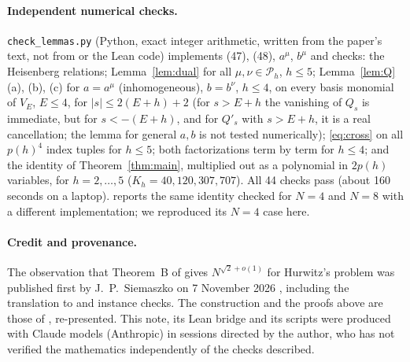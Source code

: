 \documentclass[11pt]{amsart}
\theoremstyle{remark}
\newcommand{\cP}{\mathcal{P}}
\begin{document}
\medskip

\paragraph{Independent numerical checks.} \texttt{check\_lemmas.py} (Python, exact integer arithmetic, written
from the paper's text, not from \cite{Sie} or the Lean code) implements (47), (48), $a^\mu$, $b^\mu$ and checks:
the Heisenberg relations; Lemma~\ref{lem:dual} for all $\mu,\nu\in\cP_h$, $h\le5$; Lemma~\ref{lem:Q}(a), (b), (c) for
$a=a^\mu$ (inhomogeneous), $b=b^\nu$, $h\le4$, on every basis monomial of $V_E$, $E\le4$, for $|s|\le2(E+h)+2$ (for
$s>E+h$ the vanishing of $Q_s$ is immediate, but for $s<-(E+h)$, and for $Q'_s$ with $s>E+h$, it is a real cancellation;
the lemma for general $a,b$ is not tested numerically);
\eqref{eq:cross} on all $p(h)^4$ index tuples for $h\le5$; both factorizations term by term for $h\le4$; and the identity of
Theorem~\ref{thm:main}, multiplied out as a polynomial in $2p(h)$ variables, for $h=2,\dots,5$ ($K_h=40,120,307,707$).
All 44 checks pass (about 160 seconds on a laptop). \cite{Sie} reports the same identity checked for $N=4$ and $N=8$ with a different implementation; we reproduced its $N=4$ case here.

\paragraph{Credit and provenance.} The observation that Theorem~B of \cite{ETH} gives $N^{\sqrt2+o(1)}$ for
Hurwitz's problem was published first by J.~P.~Siemaszko on 7 November 2026 \cite{Sie}, including the translation
to \cite[Lemma~3.5]{HWY} and instance checks. The construction and the proofs above are those of \cite{ETH}, re-presented. This note, its
Lean bridge and its scripts were produced with Claude models (Anthropic) in sessions directed by the author, who
has not verified the mathematics independently of the checks described.
\end{document}
